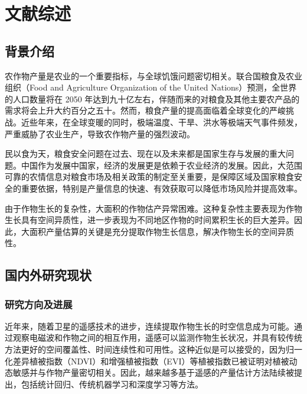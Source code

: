 \cleardoublepage
\newrefsection
\chapter{文献综述}

\section{背景介绍}

\par 农作物产量是农业的一个重要指标，与全球饥饿问题密切相关。联合国粮食及农业组织（Food and Agriculture Organization of the United Nations）预测，全世界的人口数量将在 2050 年达到九十亿左右，伴随而来的对粮食及其他主要农产品的需求将会上升大约百分之五十。然而，粮食产量的提高面临着全球变化的严峻挑战。近些年来，在全球变暖的同时，极端温度、干旱、洪水等极端天气事件频发，严重威胁了农业生产，导致农作物产量的强烈波动。

\par 民以食为天，粮食安全问题在过去、现在以及未来都是国家生存与发展的重大问题。中国作为发展中国家，经济的发展更是依赖于农业经济的发展。因此，大范围可靠的农情信息对粮食市场及相关政策的制定至关重要，是保障区域及国家粮食安全的重要依据，特别是产量信息的快速、有效获取可以降低市场风险并提高效率。

\par 由于作物生长的复杂性，大面积的作物估产异常困难。这种复杂性主要表现为作物生长具有空间异质性，进一步表现为不同地区作物的时间累积生长的巨大差异\cite{kuwata2015estimating}。因此，大面积产量估算的关键是充分提取作物生长信息，解决作物生长的空间异质性。

\section{国内外研究现状}

\subsection{研究方向及进展}

\par 近年来，随着卫星的遥感技术的进步，连续提取作物生长的时空信息成为可能。通过观察电磁波和作物之间的相互作用\cite{guan2017shared, zhang2003monitoring}，遥感可以监测作物生长状况，并具有较传统方法更好的空间覆盖性、时间连续性和可用性\cite{claverie2013validation}。这种近似是可以接受的，因为归一化差异植被指数（NDVI）和增强植被指数（EVI）等植被指数已被证明对植被动态敏感\cite{sellers1987canopy, tucker1979red}并与作物产量密切相关\cite{shanahan2001use}。因此，越来越多基于遥感的产量估计方法陆续被提出，包括统计回归、传统机器学习和深度学习等方法。

